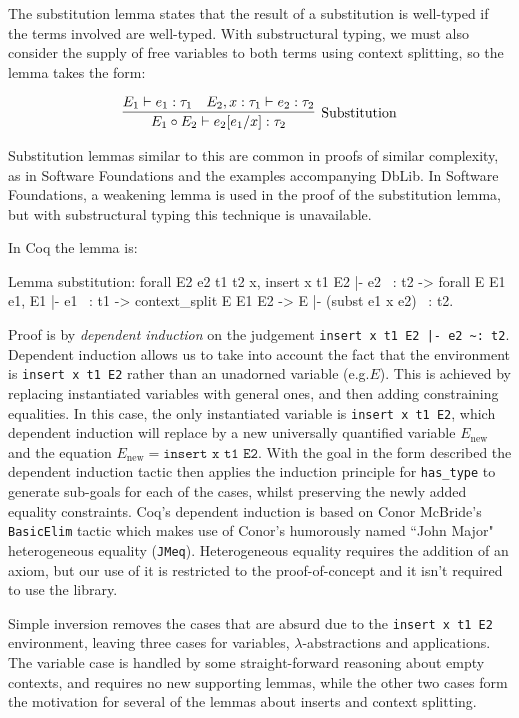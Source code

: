 \documentclass[]{unswthesis}
\newcommand{\types}{\vdash}
\let\c\texttt
\let\i\textit
\begin{document}
The substitution lemma states that the result of a substitution is well-typed if the terms involved are well-typed. With substructural typing, we must also consider the supply of free variables to both terms using context splitting, so the lemma takes the form:

\begin{eqnarray*}
\infer[\text{Substitution}]{
    E_1 \circ E_2 \types e_2 [e_1/x] : \tau_2
}{
    E_1 \types e_1 : \tau_1 \quad E_2, x : \tau_1 \types e_2 : \tau_2
}
\end{eqnarray*}

Substitution lemmas similar to this are common in proofs of similar complexity, as in Software Foundations \cite{pierce15} and the examples accompanying DbLib. In Software Foundations, a weakening lemma is used in the proof of the substitution lemma, but with substructural typing this technique is unavailable.

In Coq the lemma is:

\begin{coqcode}
Lemma substitution: forall E2 e2 t1 t2 x,
  insert x t1 E2 |- e2 ~: t2 ->
  forall E E1 e1, E1 |- e1 ~: t1 ->
  context_split E E1 E2 ->
  E |- (subst e1 x e2) ~: t2.
\end{coqcode}

Proof is by \i{dependent induction} on the judgement \c{insert x t1 E2 |- e2 \textasciitilde: t2}. Dependent induction allows us to take into account the fact that the environment is \c{insert x t1 E2} rather than an unadorned variable (e.g.$E$). This is achieved by replacing instantiated variables with general ones, and then adding constraining equalities. In this case, the only instantiated variable is \c{insert x t1 E2}, which dependent induction will replace by a new universally quantified variable $E_\text{new}$ and the equation $E_\text{new} = \c{insert x t1 E2}$. With the goal in the form described the dependent induction tactic then applies the induction principle for \c{has_type} to generate sub-goals for each of the cases, whilst preserving the newly added equality constraints. Coq's dependent induction is based on Conor McBride's \c{BasicElim} tactic \cite{mcbride00} which makes use of Conor's humorously named ``John Major" heterogeneous equality (\c{JMeq}). Heterogeneous equality requires the addition of an axiom, but our use of it is restricted to the proof-of-concept and it isn't required to use the library.

Simple inversion removes the cases that are absurd due to the \c{insert x t1 E2} environment, leaving three cases for variables, $\lambda$-abstractions and applications. The variable case is handled by some straight-forward reasoning about empty contexts, and requires no new supporting lemmas, while the other two cases form the motivation for several of the lemmas about inserts and context splitting.
\end{document}
